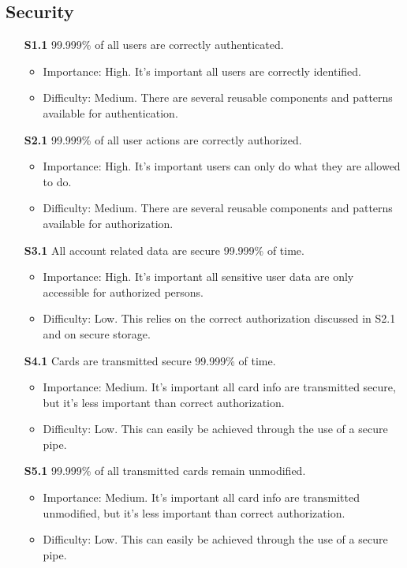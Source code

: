\documentclass[a4paper,11pt]{report}
\begin{document}
\subsection{Security}
\begin{itemize}
\item[\textbf{S1.1}] 99.999\% of all users are correctly authenticated.
\begin{itemize}
\item Importance: High. It's important all users are correctly identified.
\item Difficulty: Medium. There are several reusable components and patterns available for authentication.
\end{itemize}
\item[\textbf{S2.1}] 99.999\% of all user actions are correctly authorized.
\begin{itemize}
\item Importance: High. It's important users can only do what they are allowed to do.
\item Difficulty: Medium. There are several reusable components and patterns available for authorization.
\end{itemize}
\item[\textbf{S3.1}] All account related data are secure 99.999\% of time.
\begin{itemize}
\item Importance: High. It's important all sensitive user data are only accessible for authorized persons.
\item Difficulty: Low. This relies on the correct authorization discussed in S2.1 and on secure storage.
\end{itemize}
\item[\textbf{S4.1}] Cards are transmitted secure 99.999\% of time.
\begin{itemize}
\item Importance: Medium. It's important all card info are transmitted secure, but it's less important than correct authorization. 
\item Difficulty: Low. This can easily be achieved through the use of a secure pipe.
\end{itemize}
\item[\textbf{S5.1}] 99.999\% of all transmitted cards remain unmodified.
\begin{itemize}
\item Importance: Medium. It's important all card info are transmitted unmodified, but it's less important than correct authorization. 
\item Difficulty: Low. This can easily be achieved through the use of a secure pipe.

\end{itemize}
\end{itemize}
\end{document}

